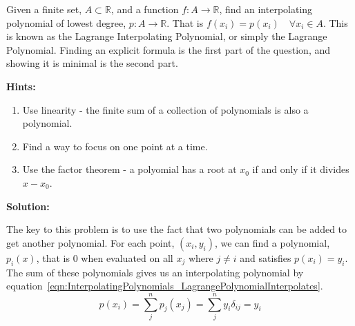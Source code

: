 Given a finite set, $A \subset \mathbb{R}$, and a function $f : A \to \mathbb{R}$, find an  interpolating polynomial of lowest degree, $p : A \to \mathbb{R}$. That is $f(x_i) = p(x_i) \quad \forall x_i \in A$. This is known as the Lagrange Interpolating Polynomial, or simply the Lagrange Polynomial. Finding an explicit formula is the first part of the question, and showing it is minimal is the second part.

\textbf{Hints:}

\begin{enumerate}
    \item Use linearity - the finite sum of a collection of polynomials is also a polynomial.
    \item Find a way to focus on one point at a time.
    \item Use the factor theorem - a polyomial has a root at $x_0$ if and only if it divides $x - x_0$.
\end{enumerate}

\textbf{Solution:}

The key to this problem is to use the fact that two polynomials can be added to get another polynomial. For each point, $(x_i, y_i)$, we can find a polynomial, $p_i(x)$, that is $0$ when evaluated on all $x_j$ where $j \ne i$ and satisfies $p(x_i) = y_i$. The sum of these polynomials gives us an interpolating polynomial by equation~\eqref{eqn:InterpolatingPolynomials_LagrangePolynomialInterpolates}.
\begin{equation}
	p(x_i) = \sum_j^n p_j(x_j) = \sum_j^n y_i \delta_{ij} = y_i
	\label{eqn:InterpolatingPolynomials_LagrangePolynomialInterpolates}
\end{equation}


